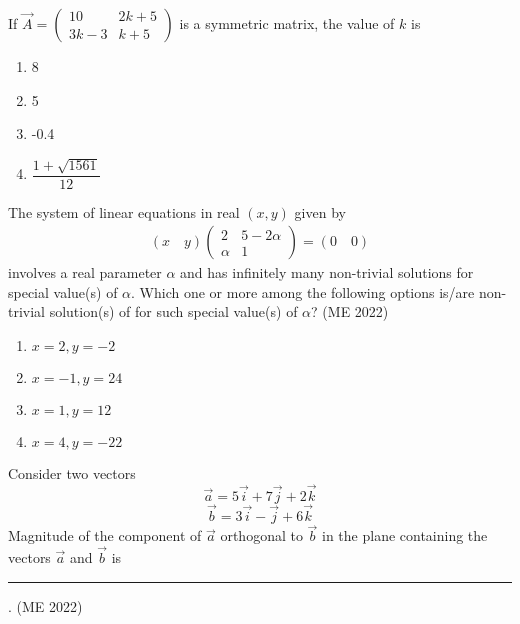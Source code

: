 \item If \(\vec{A} = \begin{pmatrix}
10 & 2k + 5 \\
3k - 3 & k + 5
\end{pmatrix}\) is a symmetric matrix, the value of \(k\) is  
\begin{multicols}{4}
\begin{enumerate}
    \item 8
    \item 5
    \item -0.4
    \item $\dfrac{1 + \sqrt{1561}}{12}$
\end{enumerate}
\end{multicols}
\item The system of linear equations in real \((x, y)\) given by
\begin{align*}
    (x \quad y)
    \begin{pmatrix}
        2 & 5 - 2\alpha \\
        \alpha & 1
    \end{pmatrix}
    = (0 \quad 0)
\end{align*}
involves a real parameter \(\alpha\) and has infinitely many non-trivial solutions for special value(s) of \(\alpha\). Which one or more among the following options is/are non-trivial solution(s) of  for such special value(s) of \(\alpha\)?
\hfill{(ME 2022)}
\begin{multicols}{4}
\begin{enumerate}
    \item $x=2,y=-2$
    \item $x=-1,y=24$
    \item $x=1,y=12$
    \item $x=4,y=-22$
\end{enumerate}
\end{multicols}
\item Consider two vectors
  \[
\vec{a} = 5\vec{i} + 7\vec{j} + 2\vec{k}
\]
\[
\vec{b} = 3\vec{i} - \vec{j} + 6\vec{k}
\]
Magnitude of the component of $\vec{a}$ orthogonal to $\vec{b}$ in the plane containing the vectors $\vec{a}$ and $\vec{b}$ is \rule{1cm}{0.01pt}.
\hfill{(ME 2022)}
